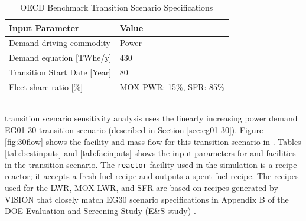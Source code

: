 \begin{table}[H]
    \centering
    \doublespacing
    \caption{OECD Benchmark Transition Scenario
	Specifications \cite{oecd_nuclear_energy_agency_wpfc_nodate}}
	\label{tab:dymondinputs}
    \small
    \begin{tabular}{ll}
    \hline
                               \textbf{Input Parameter}            & \textbf{Value}            \\ \hline
    Demand driving commodity   & Power              \\
                               Demand equation {[}TWhe/y{]}   & 430        \\
                               Transition Start Date [Year] & 80\\ 
                               Fleet share ratio [\%] & \gls{MOX} \gls{PWR}: 15\%, \gls{SFR}: 85\%\\ \hline
    \end{tabular}%
    \end{table}

\subsection{\Cyclus}
\Cyclus transition scenario sensitivity analysis uses 
the linearly increasing power demand EG01-30 transition scenario 
(described in Section \ref{sec:eg01-30}).  
Figure \ref{fig:30flow} shows the facility and mass flow 
for this transition scenario in \Cyclus. 
Tables \ref{tab:bestinputs} and \ref{tab:facinputs}
shows the input parameters for \deploy and facilities
in the transition scenario. 
The \texttt{reactor} facility used in the \Cyclus simulation 
is a recipe reactor; it accepts a fresh fuel recipe and outputs 
a spent fuel recipe. 
The recipes used for the \gls{LWR}, \gls{MOX} \gls{LWR}, and 
\gls{SFR} are based on recipes generated by VISION 
\cite{chee_arfc/transition-scenarios_2018}
that closely match EG30 scenario specifications in 
Appendix B of the \gls{DOE} Evaluation and Screening Study 
(E\&S study) \cite{wigeland_nuclear_2014}. 

